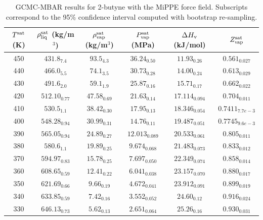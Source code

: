 \documentclass[journal=jctc,manuscript=article]{achemso}
\begin{document}
\begin{table}[htb!]
	\caption{GCMC-MBAR results for 2-butyne with the MiPPE force field. Subscripts correspond to the 95\% confidence interval computed with bootstrap re-sampling.}
	\begin{center}
		\begin{tabular}{|c|c|c|c|c|c|}
			\hline
			$T^{\rm sat}$ (K) & $\rho_{\rm liq}^{\rm sat}$ (kg/m$^3$) & $\rho_{\rm vap}^{\rm sat}$ (kg/m$^3$) & $P_{\rm vap}^{\rm sat}$ (MPa) & $\Delta H_{\rm v}$ (kJ/mol) & $Z_{\rm vap}^{\rm sat}$ \\ \hline
			450 & $431.8_{7.4}$ & $93.5_{4.3}$ & $36.24_{0.50}$ & $11.93_{0.26}$ & $0.561_{0.027}$ \\
			440 & $466.0_{5.5}$ & $74.1_{3.5}$ & $30.73_{0.28}$ & $14.00_{0.24}$ & $0.613_{0.029}$ \\
			430 & $491.6_{2.0}$ & $59.1_{1.9}$ & $25.87_{0.16}$ & $15.71_{0.17}$ & $0.662_{0.022}$ \\
			420 & $512.10_{0.77}$ & $47.58_{0.69}$ & $21.63_{0.14}$ & $17.114_{0.094}$ & $0.704_{0.011}$ \\
			410 & $530.5_{1.1}$ & $38.42_{0.30}$ & $17.95_{0.13}$ & $18.346_{0.054}$ & $0.7411_{7.7e-3}$ \\
			400 & $548.28_{0.94}$ & $30.99_{0.31}$ & $14.76_{0.11}$ & $19.487_{0.051}$ & $0.7745_{9.6e-3}$ \\
			390 & $565.05_{0.94}$ & $24.89_{0.27}$ & $12.013_{0.089}$ & $20.533_{0.061}$ & $0.805_{0.011}$ \\
			380 & $580.6_{1.1}$ & $19.89_{0.25}$ & $9.674_{0.068}$ & $21.483_{0.073}$ & $0.833_{0.012}$ \\
			370 & $594.97_{0.83}$ & $15.78_{0.25}$ & $7.697_{0.050}$ & $22.349_{0.074}$ & $0.858_{0.014}$ \\
			360 & $608.65_{0.59}$ & $12.41_{0.22}$ & $6.041_{0.038}$ & $23.157_{0.070}$ & $0.880_{0.017}$ \\
			350 & $621.69_{0.66}$ & $9.66_{0.19}$ & $4.672_{0.041}$ & $23.912_{0.091}$ & $0.899_{0.019}$ \\
			340 & $633.85_{0.59}$ & $7.42_{0.16}$ & $3.552_{0.052}$ & $24.60_{0.12}$ & $0.916_{0.024}$ \\
			330 & $646.13_{0.73}$ & $5.62_{0.13}$ & $2.651_{0.064}$ & $25.26_{0.16}$ & $0.930_{0.031}$ \\
			\hline
		\end{tabular}
	\end{center}
\end{table}
\end{document}
